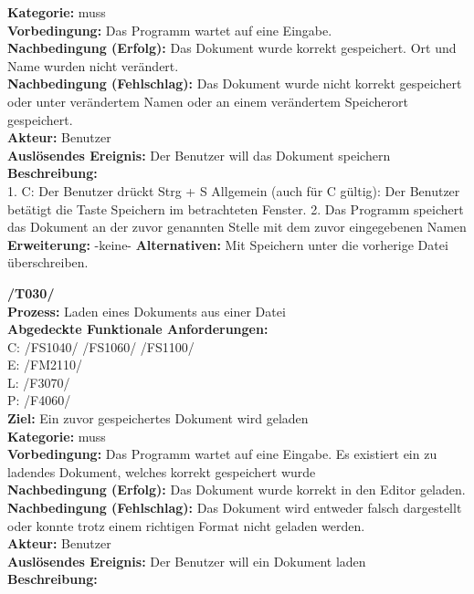 \documentclass[a4paper]{scrreprt}
\begin{document}
\begin{addmargin}[15pt]{0pt}
\textbf{Kategorie:} muss\\
\textbf{Vorbedingung:} Das Programm wartet auf eine Eingabe.\\
\textbf{Nachbedingung (Erfolg):} Das Dokument wurde korrekt gespeichert. Ort und Name wurden nicht verändert.\\
\textbf{Nachbedingung (Fehlschlag):} Das Dokument wurde nicht korrekt gespeichert oder unter verändertem Namen oder an einem verändertem Speicherort gespeichert. \\
\textbf{Akteur:} Benutzer\\
\textbf{Auslösendes Ereignis:} Der Benutzer will das Dokument speichern\\
\textbf{Beschreibung:} \\
1. C: Der Benutzer drückt Strg + S
Allgemein (auch für C gültig): Der Benutzer betätigt die Taste Speichern im betrachteten Fenster.
2. Das Programm speichert das Dokument an der zuvor genannten Stelle mit dem zuvor eingegebenen Namen
\textbf {Erweiterung:} -keine-
\textbf {Alternativen:} Mit Speichern unter die vorherige Datei überschreiben. \\
\end{addmargin}
\textbf{/T030/} \\
\textbf{Prozess: }Laden eines Dokuments aus einer Datei \\
\textbf{Abgedeckte Funktionale Anforderungen:} \\
C: /FS1040/ /FS1060/ /FS1100/\\
E: /FM2110/	\\
L: /F3070/ \\
P: /F4060/\\
\textbf{Ziel:} Ein zuvor gespeichertes Dokument wird geladen\\
\textbf{Kategorie:} muss\\
\textbf{Vorbedingung:} Das Programm wartet auf eine Eingabe. Es existiert ein zu ladendes Dokument, welches korrekt gespeichert wurde\\
\textbf{Nachbedingung (Erfolg):} Das Dokument wurde korrekt in den Editor geladen. \\
\textbf{Nachbedingung (Fehlschlag):} Das Dokument wird entweder falsch dargestellt oder konnte trotz einem richtigen Format nicht geladen werden. \\ 
\textbf{Akteur:} Benutzer\\
\textbf{Auslösendes Ereignis:} Der Benutzer will ein Dokument laden \\
\textbf{Beschreibung:} \\
\end{document}
